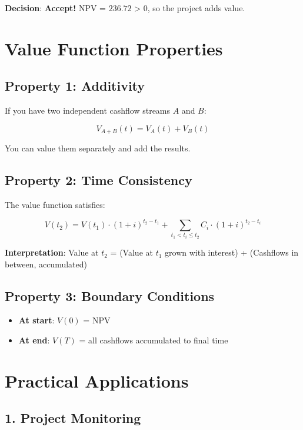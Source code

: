\documentclass[
  letterpaper,
]{scrbook}
\providecommand{\tightlist}{%
  \setlength{\itemsep}{0pt}\setlength{\parskip}{0pt}}
\begin{document}
\textbf{Decision}: \textbf{Accept!} NPV = \(236.72\) \textgreater{} 0,
so the project adds value.

\section{Value Function Properties}\label{value-function-properties}

\subsection{Property 1: Additivity}\label{property-1-additivity}

If you have two independent cashflow streams \(A\) and \(B\):

\[
V_{A+B}(t) = V_A(t) + V_B(t)
\]

You can value them separately and add the results.

\subsection{Property 2: Time
Consistency}\label{property-2-time-consistency}

The value function satisfies:

\[
V(t_2) = V(t_1) \cdot (1+i)^{t_2-t_1} + \sum_{t_1 < t_i \leq t_2} C_i \cdot (1+i)^{t_2-t_i}
\]

\textbf{Interpretation}: Value at \(t_2\) = (Value at \(t_1\) grown with
interest) + (Cashflows in between, accumulated)

\subsection{Property 3: Boundary
Conditions}\label{property-3-boundary-conditions}

\begin{itemize}
\tightlist
\item
  \textbf{At start}: \(V(0)\) = NPV
\item
  \textbf{At end}: \(V(T)\) = all cashflows accumulated to final time
\end{itemize}

\section{Practical Applications}\label{practical-applications}

\subsection{1. Project Monitoring}\label{project-monitoring}
\end{document}
